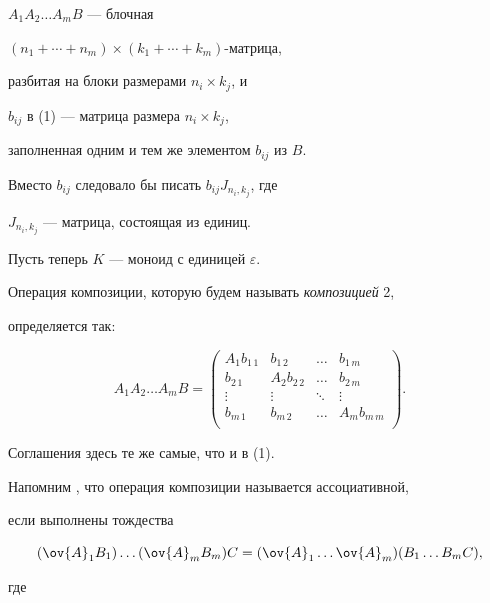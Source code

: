 $A_1 A_2 \dotsc A_m B$ --- блочная


$(n_1+\dotsb +n_m)\times (k_1+\dotsb +k_m)$-матрица, 


разбитая на блоки размерами $n_i\times k_j$, и


$b_{ij}$ в (1) --- матрица размера $n_i\times k_j$,


заполненная одним и тем же элементом $b_{ij}$ из $B$.


Вместо $b_{ij}$ следовало бы писать $b_{ij}J_{n_i, k_j}$, где


$J_{n_i,k_j}$ --- матрица, состоящая из единиц.





Пусть теперь $K$ --- моноид с единицей $\varepsilon$.


Операция композиции, которую будем называть {\it композицией} 2, 


определяется так:


\begin{equation}


A_1 A_2 \dotsc A_m B=


\begin{pmatrix}


A_1b_{1\,1} & b_{1\,2} & \dotsc & b_{1\,m} \\


b_{2\,1} & A_2b_{2\,2} & \dotsc & b_{2\, m} \\


\vdots & \vdots  & \ddots & \vdots \\


b_{m\,1} & b_{m\,2} & \dotsc & A_mb_{m\,m} \\


\end{pmatrix}


.


\end{equation}


Соглашения здесь те же самые, что и в (1).





Напомним \cite{TK}, что операция композиции называется ассоциативной,


если выполнены тождества


$$


(\ov{A}_1 B_1)\dotsc (\ov{A}_m B_m)C=


(\ov{A}_1\dotsc \ov{A}_m)(B_1\dotsc B_mC),


$$


где


